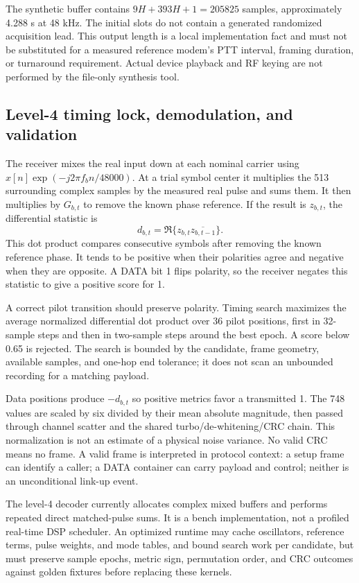 The synthetic buffer contains $9H+393H+1=205825$ samples, approximately
4.288 s at 48 kHz. The initial slots do not contain a generated randomized
acquisition lead. This output length is a local implementation fact and must
not be substituted for a measured reference modem's PTT interval, framing
duration, or turnaround requirement. Actual device playback and RF keying are
not performed by the file-only synthesis tool.

\subsection{Level-4 timing lock, demodulation, and validation}
The receiver mixes the real input down at each nominal carrier using
$x[n]\exp(-j2\pi f_b n/48000)$. At a trial symbol center it multiplies the
513 surrounding complex samples by the measured real pulse and sums them.
It then multiplies by $G_{b,t}$ to remove the known phase reference. If the
result is $z_{b,t}$, the differential statistic is
\[
 d_{b,t}=\Re\{z_{b,t}\overline{z_{b,t-1}}\}.
\]
This dot product compares consecutive symbols after removing the known
reference phase. It tends to be positive when their polarities agree
and negative when they are opposite. A DATA bit 1 flips polarity,
so the receiver negates this statistic to give a positive score for 1.

A correct pilot transition should preserve polarity. Timing search maximizes
the average normalized differential dot product over 36 pilot positions,
first in 32-sample steps and then in two-sample steps around the best epoch.
A score below 0.65 is rejected. The search is bounded by the candidate, frame
geometry, available samples, and one-hop end tolerance; it does not scan an
unbounded recording for a matching payload.

Data positions produce $-d_{b,t}$ so positive metrics favor a transmitted 1.
The 748 values are scaled by six divided by their mean absolute magnitude,
then passed through channel scatter and the shared turbo/de-whitening/CRC
chain. This normalization is not an estimate of a physical noise variance.
No valid CRC means no frame. A valid frame is interpreted in protocol context:
a setup frame can identify a caller; a DATA container can carry payload and
control; neither is an unconditional link-up event.

The level-4 decoder currently allocates complex mixed buffers and performs
repeated direct matched-pulse sums. It is a bench implementation, not a
profiled real-time DSP scheduler. An optimized runtime may cache oscillators,
reference terms, pulse weights, and mode tables, and bound search work per
candidate, but must preserve sample epochs, metric sign, permutation order,
and CRC outcomes against golden fixtures before replacing these kernels.

